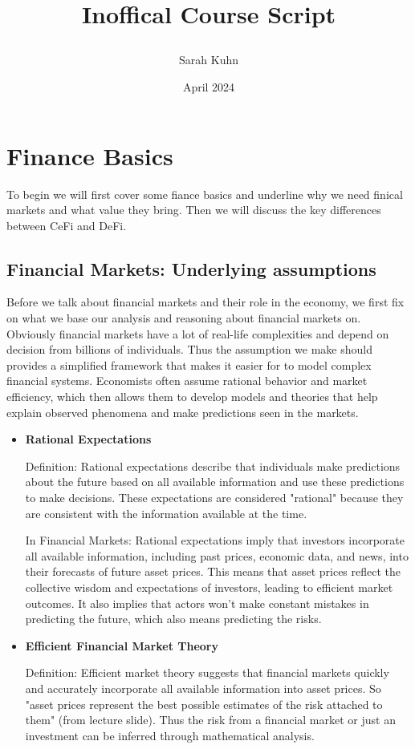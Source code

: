 \documentclass{article}
\title{%
  \large {Inoffical Course Script}
\author{Sarah Kuhn}
\date{April 2024}
}
\begin{document}
\maketitle
\thispagestyle{empty} %

\newpage
{} %
\setcounter{page}{1} %

\section{Finance Basics}
To begin we will first cover some fiance basics and underline why we need finical markets and what value they bring. Then we will discuss the key differences between CeFi and DeFi.
\subsection{Financial Markets: Underlying assumptions} 
Before we  talk about financial markets and their role in the economy, we first fix on what we base our analysis and reasoning about financial markets on. Obviously financial markets have a lot of real-life complexities and depend on decision from billions of individuals. Thus the assumption we make should provides a simplified framework that makes it easier for  to model complex financial systems. Economists often assume rational behavior and market efficiency, which then allows them to develop models and theories that help explain observed phenomena and make predictions seen in the markets.
\begin{itemize}
    \item \textbf{Rational Expectations}

Definition: Rational expectations describe that individuals make predictions about the future based on all available information and use these predictions to make decisions. These expectations are considered "rational" because they are consistent with the information available at the time.

In Financial Markets: Rational expectations imply that investors incorporate all available information, including past prices, economic data, and news, into their forecasts of future asset prices. This means that asset prices reflect the collective wisdom and expectations of investors, leading to efficient market outcomes. It also implies that actors won't make constant mistakes in predicting the future, which also means predicting the risks. 

    \item \textbf{Efficient Financial Market Theory}

    Definition: Efficient market theory suggests that financial markets quickly and accurately incorporate all available information into asset prices. So "asset prices represent the best possible estimates of the risk attached to them" (from lecture slide). Thus the risk from a financial market or just an investment can be inferred through mathematical analysis.

    \end{itemize}
\end{document}
